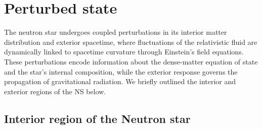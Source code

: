 \section{Perturbed state }
The neutron star undergoes coupled perturbations in its interior matter distribution and exterior spacetime, where fluctuations of the relativistic fluid are dynamically linked to spacetime curvature through Einstein’s field equations. These perturbations encode information about the dense-matter equation of state and the star’s internal composition, while the exterior response governs the propagation of gravitational radiation. We briefly outlined the interior and exterior regions of the NS below.
\label{Pert}
\subsection{Interior region of the Neutron star}

